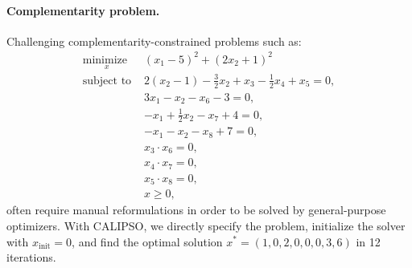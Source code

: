 \paragraph{Complementarity problem.}
Challenging complementarity-constrained problems such as:
\begin{equation}
	\begin{array}{ll}
		\underset{x}{\mbox{minimize }} & (x_1 - 5)^2 + (2x_2 + 1)^2 \\
		\mbox{subject to } & 2 (x_2 -1) - \frac{3}{2} x_2 + x_3 - \frac{1}{2} x_4 + x_5 = 0, \\
		& 3 x_1 - x_2 - x_6 - 3 = 0, \\
		& -x_1 + \frac{1}{2} x_2 - x_7 + 4 = 0, \\ 
		& -x_1 - x_2 - x_8 + 7 = 0, \\ 
		& x_3 \cdot x_6 = 0, \\
		& x_4 \cdot x_7 = 0, \\ 
		& x_5 \cdot x_8 = 0, \\
		& x \geq 0,
	\end{array}
	\label{knitro_problem}
\end{equation}
often require manual reformulations in order to be solved by general-purpose optimizers. With CALIPSO, we directly specify the problem, initialize the solver with $x_{\mbox{init}} = 0$, and find the optimal solution $x^* = (1, 0, 2, 0, 0, 0, 3, 6)$ in 12 iterations.

